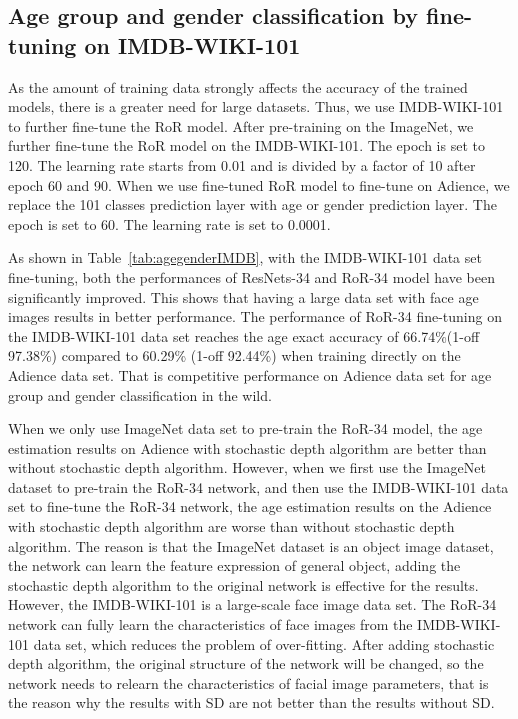 \documentclass[journal]{IEEEtran}
\begin{document}
\subsection{Age group and gender classification by fine-tuning on IMDB-WIKI-101}
As the amount of training data strongly affects the accuracy of the trained models, there is a greater need for large datasets. Thus, we use IMDB-WIKI-101 to further fine-tune the RoR model. After pre-training on the ImageNet, we further fine-tune the RoR model on the IMDB-WIKI-101. The epoch is set to 120. The learning rate starts from 0.01 and is divided by a factor of 10 after epoch 60 and 90. When we use fine-tuned RoR model to fine-tune on Adience, we replace the 101 classes prediction layer with age or gender prediction layer. The epoch is set to 60. The learning rate is set to 0.0001.
\par
As shown in Table~\ref{tab:agegenderIMDB}, with the IMDB-WIKI-101 data set fine-tuning, both the performances of ResNets-34 and RoR-34 model have been significantly improved. This shows that having a large data set with face age images results in better performance. The performance of RoR-34 fine-tuning on the IMDB-WIKI-101 data set reaches the age exact accuracy of 66.74\%(1-off 97.38\%) compared to 60.29\% (1-off 92.44\%) when training directly on the Adience data set. That is competitive performance on Adience data set for age group and gender classification in the wild.
\par
When we only use ImageNet data set to pre-train the RoR-34 model, the age estimation results on Adience with stochastic depth algorithm are better than without stochastic depth algorithm. However, when we first use the ImageNet dataset to pre-train the RoR-34 network, and then use the IMDB-WIKI-101 data set to fine-tune the RoR-34 network, the age estimation results on the Adience with stochastic depth algorithm are worse than without stochastic depth algorithm. The reason is that the ImageNet dataset is an object image dataset, the network can learn the feature expression of general object, adding the stochastic depth algorithm to the original network is effective for the results. However, the IMDB-WIKI-101 is a large-scale face image data set. The RoR-34 network can fully learn the characteristics of face images from the IMDB-WIKI-101 data set, which reduces the problem of over-fitting. After adding stochastic depth algorithm, the original structure of the network will be changed, so the network needs to relearn the characteristics of facial image parameters, that is the reason why the results with SD are not better than the results without SD.
\end{document}
